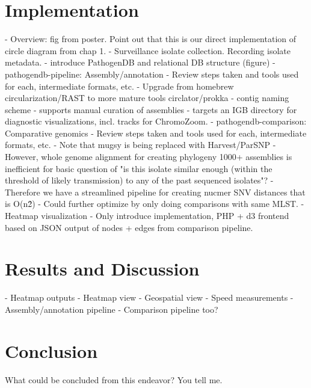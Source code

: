 \section{Implementation}

- Overview: fig from poster. Point out that this is our direct implementation of circle diagram from chap 1.
- Surveillance isolate collection. Recording isolate metadata.
    - introduce PathogenDB and relational DB structure (figure)
- pathogendb-pipeline: Assembly/annotation
    - Review steps taken and tools used for each, intermediate formats, etc.
    - Upgrade from homebrew circularization/RAST to more mature tools circlator/prokka
    - contig naming scheme
    - supports manual curation of assemblies
    - targets an IGB directory for diagnostic visualizations, incl. tracks for ChromoZoom.
- pathogendb-comparison: Comparative genomics
    - Review steps taken and tools used for each, intermediate formats, etc.
    - Note that mugsy is being replaced with Harvest/ParSNP
    - However, whole genome alignment for creating phylogeny 1000+ assemblies is inefficient for basic question of "is this isolate similar enough (within the threshold of likely transmission) to any of the past sequenced isolates"?
    - Therefore we have a streamlined pipeline for creating nucmer SNV distances that is O(n\^2)
        - Could further optimize by only doing comparisons with same MLST.
- Heatmap visualization
    - Only introduce implementation, PHP + d3 frontend based on JSON output of nodes + edges from comparison pipeline.

\section{Results and Discussion}

- Heatmap outputs
    - Heatmap view
    - Geospatial view
- Speed measurements
    - Assembly/annotation pipeline
    - Comparison pipeline too?

\section{Conclusion}

What could be concluded from this endeavor? You tell me.